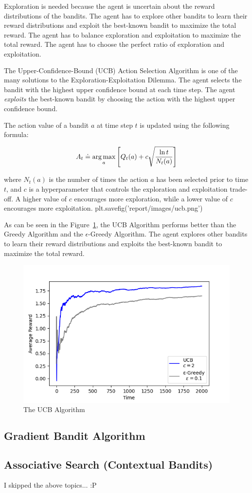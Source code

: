 Exploration is needed because the agent is uncertain about the reward distributions of the bandits. The agent has to explore other bandits to learn their reward distributions and exploit the best-known bandit to maximize the total reward. The agent has to balance exploration and exploitation to maximize the total reward. The agent has to choose the perfect ratio of exploration and exploitation.

The Upper-Confidence-Bound (UCB) Action Selection Algorithm is one of the many solutions to the Exploration-Exploitation Dilemma. The agent selects the bandit with the highest upper confidence bound at each time step. The agent \textit{exploits} the best-known bandit by choosing the action with the highest upper confidence bound.

The action value of a bandit $a$ at time step $t$ is updated using the following formula:

\begin{equation}
    A_t \doteq \operatorname*{arg\,max}_{a} \left[Q_t(a) + c\sqrt{\frac{\ln t}{N_t(a)}}\right]
\end{equation}

where $N_t(a)$ is the number of times the action $a$ has been selected prior to time $t$, and $c$ is a hyperparameter that controls the exploration and exploitation trade-off. A higher value of $c$ encourages more exploration, while a lower value of $c$ encourages more exploitation.
plt.savefig('report/images/ucb.png')

As can be seen in the Figure~\ref{fig:ucb}, the UCB Algorithm performs better than the Greedy Algorithm and the $\epsilon$-Greedy Algorithm. The agent explores other bandits to learn their reward distributions and exploits the best-known bandit to maximize the total reward.

\begin{figure}[h!]
    \centering
    \includegraphics[width=0.75\linewidth]{images/ucb.png}
    \caption{The UCB Algorithm}
    \label{fig:ucb}
\end{figure}

\subsection{Gradient Bandit Algorithm}

\subsection{Associative Search (Contextual Bandits)}

I skipped the above topics$\dots$ :P 
